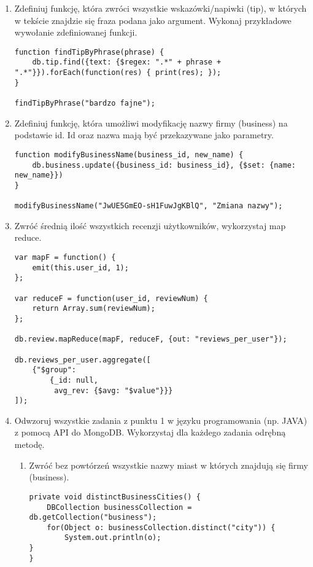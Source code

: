 \documentclass[a4paper,9pt]{extarticle}	%
\begin{document}
\begin{enumerate}
	\item Zdefiniuj funkcję, która zwróci wszystkie wskazówki/napiwki (tip), w których w tekście znajdzie się fraza podana jako argument. Wykonaj przykładowe wywołanie zdefiniowanej funkcji.
	\begin{lstlisting}
function findTipByPhrase(phrase) {
    db.tip.find({text: {$regex: ".*" + phrase + ".*"}}).forEach(function(res) { print(res); });
}

findTipByPhrase("bardzo fajne");
	\end{lstlisting}
	
	\item Zdefiniuj funkcję, która umożliwi modyfikację nazwy firmy (business) na podstawie id. Id oraz nazwa mają być przekazywane jako parametry.
	\begin{lstlisting}
function modifyBusinessName(business_id, new_name) {
    db.business.update({business_id: business_id}, {$set: {name: new_name}})
}

modifyBusinessName("JwUE5GmEO-sH1FuwJgKBlQ", "Zmiana nazwy");
	\end{lstlisting}
	
	\item Zwróć średnią ilość wszystkich recenzji użytkowników, wykorzystaj map reduce.
	\begin{lstlisting}
var mapF = function() {
    emit(this.user_id, 1);
};

var reduceF = function(user_id, reviewNum) {
    return Array.sum(reviewNum);
};

db.review.mapReduce(mapF, reduceF, {out: "reviews_per_user"});

db.reviews_per_user.aggregate([
    {"$group": 
        {_id: null,
         avg_rev: {$avg: "$value"}}}
]);
	\end{lstlisting}

	\item Odwzoruj wszystkie zadania z punktu 1 w języku programowania (np. JAVA) z pomocą API do MongoDB. Wykorzystaj dla każdego zadania odrębną metodę.
	\begin{enumerate}
	  \item Zwróć bez powtórzeń wszystkie nazwy miast w których znajdują się firmy (business).
	  \begin{lstlisting}
private void distinctBusinessCities() {
	DBCollection businessCollection = db.getCollection("business");
	for(Object o: businessCollection.distinct("city")) {
		System.out.println(o);
}
}
	  \end{lstlisting}
	  

\end{enumerate}
\end{enumerate}
\end{document}
